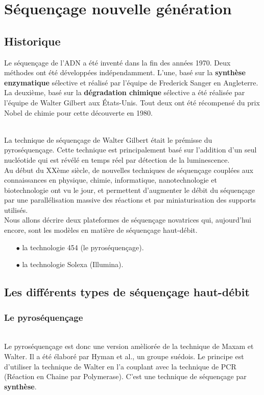 \section{Séquençage nouvelle génération}
\subsection*{Historique}
	Le séquençage de l'ADN a été inventé dans la fin des années 1970.
Deux méthodes ont été développées indépendamment.
L'une, basé sur la \textbf{synthèse enzymatique} sélective et réalisé par l'équipe de Frederick Sanger en Angleterre.
La deuxième, basé sur la \textbf{dégradation chimique} sélective a été réalisée par l'équipe de Walter Gilbert aux États-Unis.
Tout deux ont été récompensé du prix Nobel de chimie pour cette découverte en 1980.

~~\\
La technique de séquençage de Walter Gilbert était le prémisse du pyroséquençage. Cette technique est principalement basé sur l'addition d'un seul nucléotide qui est révélé en temps réel par détection de la  luminescence. 
~~\\
Au début du XXème siècle, de nouvelles techniques de séquençage couplées aux connaissances en physique, chimie, informatique, nanotechnologie et biotechnologie ont vu le jour, et permettent d'augmenter le débit du séquençage par une parallélisation massive des réactions et par miniaturisation des supports utilisés.
~~\\
Nous allons décrire deux plateformes de séquençage novatrices qui, aujourd'hui encore, sont les modèles en matière de séquençage haut-débit.
~~\\
\begin{itemize}
\item[$\bullet$]la technologie 454 (le pyroséquençage).
\item[$\bullet$]la technologie Solexa (Illumina).
\end{itemize}
	
\subsection*{Les différents types de séquençage haut-débit{\scriptsize \cite{NGS}\cite{NGS2}\cite{NGS3}\cite{NGS4}\cite{NGS5}}}
	\subsubsection*{Le pyroséquençage}
	~~\\
Le pyroséquençage est donc une version amèliorée de la technique de Maxam et Walter. Il a été élaboré par Hyman et al., un groupe suédois. Le principe est d'utiliser la technique de Walter en l'a couplant avec la technique de PCR (Réaction en Chaine par Polymerase). C'est une technique de séquençage par \textbf{synthèse}.

